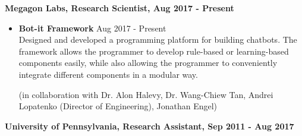 {\bf Megagon Labs, Research Scientist, Aug 2017 - Present}
\begin{itemize}
\item{\bf Bot-it Framework} \hfill Aug 2017 - Present \\
Designed and developed a programming platform for building chatbots. The
framework allows the programmer to develop rule-based or learning-based components
easily, while also allowing the programmer to conveniently integrate different
components in a modular way.

(in collaboration with Dr. Alon Halevy, Dr. Wang-Chiew Tan, Andrei Lopatenko
(Director of Engineering), Jonathan Engel)
\end{itemize}


{\bf University of Pennsylvania, Research Assistant, Sep 2011 - Aug 2017}

